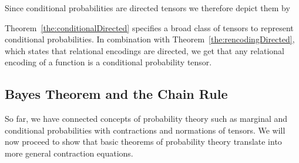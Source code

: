 Since conditional probabilities are directed tensors we therefore depict them by
\begin{center}
	
\end{center}


%
Theorem~\ref{the:conditionalDirected} specifies a broad class of tensors to represent conditional probabilities.
In combination with Theorem~\ref{the:rencodingDirected}, which states that relational encodings are directed, we get that any relational encoding of a function is a conditional probability tensor.
















\subsection{Bayes Theorem and the Chain Rule}

So far, we have connected concepts of probability theory such as marginal and conditional probabilities with contractions and normations of tensors.
We will now proceed to show that basic theorems of probability theory translate into more general contraction equations.

